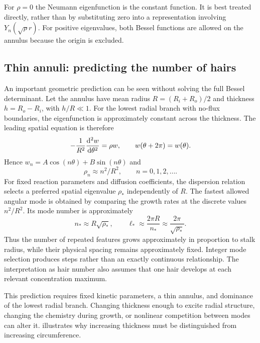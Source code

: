 \documentclass[main.tex]{subfiles}
\begin{document}
For $\rho=0$ the Neumann eigenfunction is the constant function. It is best treated directly, rather than by substituting zero into a representation involving $Y_n(\sqrt{\rho}r)$. For positive eigenvalues, both Bessel functions are allowed on the annulus because the origin is excluded.

\subsection{Thin annuli: predicting the number of hairs}\label{merged:thinannulus}
An important geometric prediction can be seen without solving the full Bessel determinant. Let the annulus have mean radius $R=(R_i+R_o)/2$ and thickness $h=R_o-R_i$, with $h/R\ll1$. For the lowest radial branch with no-flux boundaries, the eigenfunction is approximately constant across the thickness. The leading spatial equation is therefore
\begin{equation}
-\frac{1}{R^2}\fdd{w}{\theta}=\rho w,
\qquad w(\theta+2\pi)=w(\theta).
\end{equation}
Hence $w_n=A\cos(n\theta)+B\sin(n\theta)$ and
\begin{equation}\label{merged:ringmodes}
\rho_n\approx n^2/R^2,\qquad n=0,1,2,\ldots.
\end{equation}
For fixed reaction parameters and diffusion coefficients, the dispersion relation selects a preferred spatial eigenvalue $\rho_*$ independently of $R$. The fastest allowed angular mode is obtained by comparing the growth rates at the discrete values $n^2/R^2$. Its mode number is approximately
\begin{equation}
n_*\approx R\sqrt{\rho_*},\qquad
\ell_*\approx\frac{2\pi R}{n_*}\approx\frac{2\pi}{\sqrt{\rho_*}}.
\end{equation}
Thus the number of repeated features grows approximately in proportion to stalk radius, while their physical spacing remains approximately fixed. Integer mode selection produces steps rather than an exactly continuous relationship. The interpretation as hair number also assumes that one hair develops at each relevant concentration maximum.

This prediction requires fixed kinetic parameters, a thin annulus, and dominance of the lowest radial branch. Changing thickness enough to excite radial structure, changing the chemistry during growth, or nonlinear competition between modes can alter it.  illustrates why increasing thickness must be distinguished from increasing circumference.
\end{document}
